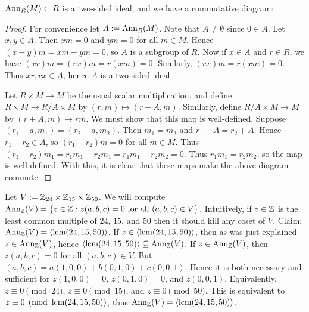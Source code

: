\begin{proposition}
	$\operatorname{Ann}_R(M) \subset R$ is a two-sided ideal, and we have a commutative diagram:
	\begin{center}
	\end{center}
\end{proposition}
	\begin{proof}
	For convenience let $A:= \operatorname{Ann}_R(M)$. Note that $A \neq \emptyset$ since $0 \in A$. Let $x,y \in A$. Then $xm = 0$ and $ym = 0$ for all $m \in M$. Hence $(x-y)m = xm - ym = 0$, so $A$ is a subgroup of $R$. Now if $x \in A$ and $r \in R$, we have $(xr)m = (rx)m = r(xm) = 0$. Similarly, $(rx)m = r(xm) = 0$. Thus $xr,rx \in A$, hence $A$ is a two-sided ideal.

	Let $R \times M \rightarrow M$ be the usual scalar multiplication, and define $R \times M \rightarrow R/A \times M$ by $(r,m) \mapsto (r + A,m)$. Similarly, define $R/A \times M \rightarrow M$ by $(r + A,m) \mapsto rm$. We must show that this map is well-defined. Suppose $(r_1 + a,m_1) = (r_2 + a,m_2)$. Then $m_1 = m_2$ and $r_1 + A = r_2 + A$. Hence $r_1-r_2 \in A$, so $(r_1-r_2)m = 0$ for all $m \in M$. Thus $(r_1-r_2)m_1 = r_1m_1 - r_2m_1 = r_1m_1 - r_2m_2 = 0$. Thus $r_1m_1 = r_2m_2$, so the map is well-defined. With this, it is clear that these maps make the above diagram commute. 
\end{proof}

\begin{example}
	Let $V := \mathbb{Z}_{24} \times \mathbb{Z}_{15} \times \mathbb{Z}_{50}$. We will compute $\operatorname{Ann}_{\mathbb{Z}}(V) = \{z \in \mathbb{Z} : z(a,b,c) = 0 \text{ for all $(a,b,c) \in V$}\}$. Intuitively, if $z \in \mathbb{Z}$ is the least common multiple of $24$, $15$, and $50$ then it should kill any coset of $V$. Claim: $\operatorname{Ann}_{\mathbb{Z}}(V) = \left<\operatorname{lcm}(24,15,50) \right>$. If $z \in \left<\operatorname{lcm}(24,15,50) \right>$, then as was just explained $z \in \operatorname{Ann}_{\mathbb{Z}}(V)$, hence $\left<\operatorname{lcm}(24,15,50) \right> \subseteq \operatorname{Ann}_{\mathbb{Z}}(V)$. If $z \in \operatorname{Ann}_{\mathbb{Z}}(V)$, then $z(a,b,c) = 0$ for all $(a,b,c) \in V$. But $(a,b,c) = a(1,0,0) + b(0,1,0) + c(0,0,1)$. Hence it is both necessary and sufficient for $z(1,0,0) = 0$, $z(0,1,0) = 0$, and $z(0,0,1)$. Equivalently, $z \equiv 0 \pmod{24}$, $z \equiv 0 \pmod{15}$, and $z \equiv 0 \pmod{50}$. This is equivalent to $z \equiv 0 \pmod{\operatorname{lcm}(24,15,50)}$, thus $\operatorname{Ann}_{\mathbb{Z}}(V) = \left<\operatorname{lcm}(24,15,50) \right>$.
\end{example}

